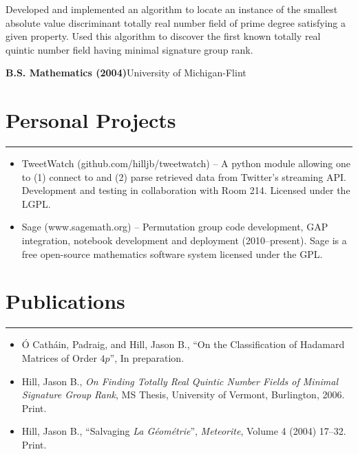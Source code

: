 \documentclass[letterpaper,10pt]{article}
\newcommand{\mblue}{\color{darkblue}}
\begin{document}
Developed and implemented an algorithm to locate an instance of the smallest absolute value
discriminant totally real number field of prime degree satisfying a given property. Used this
algorithm to discover the first known totally real quintic number field having minimal signature
group rank.

\bigbreak \textbf{B.S. Mathematics (2004)}\hfill University of Michigan-Flint


\section*{\mblue Personal Projects}

\vspace{-2.15pc}
{\hfill\mblue\rule{5.21in}{0.02cm}}

\vspace{1pc}
\begin{itemize}
\item TweetWatch (github.com/hilljb/tweetwatch) -- A python module allowing one to (1) connect to
and (2) parse retrieved data from Twitter's streaming API. Development and testing in collaboration
with Room 214. Licensed under the LGPL.

\item Sage (www.sagemath.org) -- Permutation group code development, GAP integration, notebook
development and deployment (2010--present). Sage is a free open-source mathematics software system
licensed under the GPL.
\end{itemize}


\section*{\mblue Publications}

\vspace{-2.15pc}
{\hfill\mblue\rule{5.64in}{0.02cm}}

\vspace{1pc}
\begin{itemize}
\item \'O Cath\'ain, Padraig, and Hill, Jason B., ``On the Classification of Hadamard Matrices of Order
$4p$'', In preparation.
\item Hill, Jason B., \textit{On Finding Totally Real Quintic Number Fields of Minimal Signature
Group Rank}, MS Thesis, University of Vermont, Burlington, 2006. Print.
\item Hill, Jason B., ``Salvaging \textit{La G\'eom\'etrie}'', \textit{Meteorite}, Volume 4 (2004)
17--32. Print.
\end{itemize}
\end{document}
